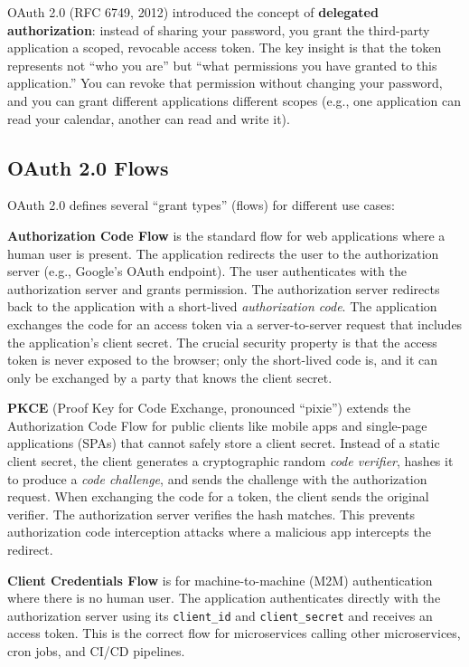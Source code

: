 \documentclass[11pt,a4paper]{article}
\begin{document}
OAuth 2.0 (RFC 6749, 2012) introduced the concept of \textbf{delegated authorization}: instead of sharing your password, you grant the third-party application a scoped, revocable access token. The key insight is that the token represents not ``who you are'' but ``what permissions you have granted to this application.'' You can revoke that permission without changing your password, and you can grant different applications different scopes (e.g., one application can read your calendar, another can read and write it).

\subsection{OAuth 2.0 Flows}

OAuth 2.0 defines several ``grant types'' (flows) for different use cases:

\textbf{Authorization Code Flow} is the standard flow for web applications where a human user is present. The application redirects the user to the authorization server (e.g., Google's OAuth endpoint). The user authenticates with the authorization server and grants permission. The authorization server redirects back to the application with a short-lived \textit{authorization code}. The application exchanges the code for an access token via a server-to-server request that includes the application's client secret. The crucial security property is that the access token is never exposed to the browser; only the short-lived code is, and it can only be exchanged by a party that knows the client secret.

\textbf{PKCE} (Proof Key for Code Exchange, pronounced ``pixie'') extends the Authorization Code Flow for public clients like mobile apps and single-page applications (SPAs) that cannot safely store a client secret. Instead of a static client secret, the client generates a cryptographic random \textit{code verifier}, hashes it to produce a \textit{code challenge}, and sends the challenge with the authorization request. When exchanging the code for a token, the client sends the original verifier. The authorization server verifies the hash matches. This prevents authorization code interception attacks where a malicious app intercepts the redirect.

\textbf{Client Credentials Flow} is for machine-to-machine (M2M) authentication where there is no human user. The application authenticates directly with the authorization server using its \texttt{client\_id} and \texttt{client\_secret} and receives an access token. This is the correct flow for microservices calling other microservices, cron jobs, and CI/CD pipelines.
\end{document}

